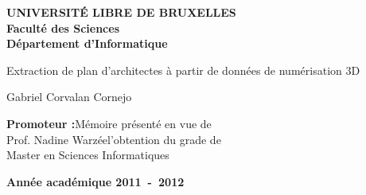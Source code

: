 \begin{titlepage}
\begin{center}
\textbf{UNIVERSIT\'E LIBRE DE BRUXELLES}\\
\textbf{Faculté des Sciences}\\
\textbf{Département d'Informatique}
\vfill{}\vfill{}

{\Huge  Extraction de plan d'architectes \vspace*{.5cm}  \linebreak[4] à partir de données de numérisation 3D}

{\Huge \par}
\begin{center}{\LARGE Gabriel Corvalan Cornejo}\end{center}{\Huge \par}
\vfill{}\vfill{}
\begin{flushright}{\large \textbf{Promoteur :}}\hfill{}{\large Mémoire présenté en vue de}\\
{\large Prof. Nadine Warzée}\hfill{}{\large l'obtention du grade de}\\
\hfill{}{\large Master en Sciences Informatiques}\end{flushright}{\large\par}
\vfill{}\vfill{}\enlargethispage{3cm}
\textbf{Année académique 2011~-~2012}
\end{center}
\end{titlepage}

\newpage
\thispagestyle{empty} 
\null

\newenvironment{vcenterpage}
{\newpage\thispagestyle{empty} 
\vspace*{\fill}}
{\vspace*{\fill}\par\pagebreak}